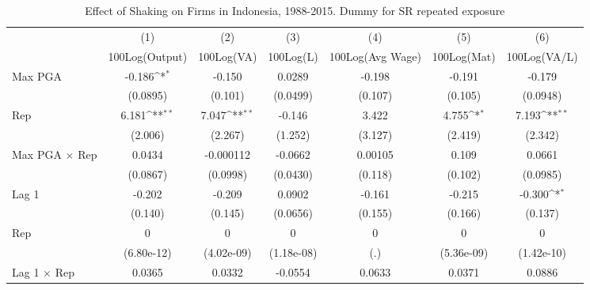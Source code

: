 \begin{table}[htbp]\centering
\def\sym#1{\ifmmode^{#1}\else\(^{#1}\)\fi}
\caption{Effect of Shaking on Firms in Indonesia, 1988-2015. Dummy for SR repeated exposure}
\begin{tabular}{l*{6}{c}}
\toprule
                &\multicolumn{1}{c}{(1)}&\multicolumn{1}{c}{(2)}&\multicolumn{1}{c}{(3)}&\multicolumn{1}{c}{(4)}&\multicolumn{1}{c}{(5)}&\multicolumn{1}{c}{(6)}\\
                &\multicolumn{1}{c}{100Log(Output)}&\multicolumn{1}{c}{100Log(VA)}&\multicolumn{1}{c}{100Log(L)}&\multicolumn{1}{c}{100Log(Avg Wage)}&\multicolumn{1}{c}{100Log(Mat)}&\multicolumn{1}{c}{100Log(VA/L)}\\
\midrule
Max PGA         &   -0.186\sym{*}  &   -0.150         &   0.0289         &   -0.198         &   -0.191         &   -0.179         \\
                & (0.0895)         &  (0.101)         & (0.0499)         &  (0.107)         &  (0.105)         & (0.0948)         \\
\addlinespace
Rep             &    6.181\sym{**} &    7.047\sym{**} &   -0.146         &    3.422         &    4.755\sym{*}  &    7.193\sym{**} \\
                &  (2.006)         &  (2.267)         &  (1.252)         &  (3.127)         &  (2.419)         &  (2.342)         \\
\addlinespace
Max PGA $\times$ Rep&   0.0434         &-0.000112         &  -0.0662         &  0.00105         &    0.109         &   0.0661         \\
                & (0.0867)         & (0.0998)         & (0.0430)         &  (0.118)         &  (0.102)         & (0.0985)         \\
\addlinespace
Lag 1           &   -0.202         &   -0.209         &   0.0902         &   -0.161         &   -0.215         &   -0.300\sym{*}  \\
                &  (0.140)         &  (0.145)         & (0.0656)         &  (0.155)         &  (0.166)         &  (0.137)         \\
\addlinespace
Rep             &        0         &        0         &        0         &        0         &        0         &        0         \\
                &(6.80e-12)         &(4.02e-09)         &(1.18e-08)         &      (.)         &(5.36e-09)         &(1.42e-10)         \\
\addlinespace
Lag 1 $\times$ Rep&   0.0365         &   0.0332         &  -0.0554         &   0.0633         &   0.0371         &   0.0886         \\

\end{tabular}
\end{table}
